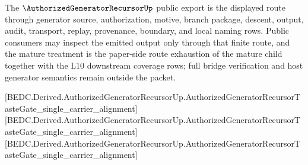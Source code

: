 The $\AuthorizedGeneratorRecursorUp$ public export is the displayed route through generator source, authorization, motive, branch package, descent, output, audit, transport, replay, provenance, boundary, and local naming rows. Public consumers may inspect the emitted output only through that finite route, and the mature treatment is the paper-side route exhaustion of the mature child together with the L10 downstream coverage rows; full bridge verification and host generator semantics remain outside the packet.

[BEDC.Derived.AuthorizedGeneratorRecursorUp.AuthorizedGeneratorRecursorTasteGate\_single\_carrier\_alignment]
[BEDC.Derived.AuthorizedGeneratorRecursorUp.AuthorizedGeneratorRecursorTasteGate\_single\_carrier\_alignment]
[BEDC.Derived.AuthorizedGeneratorRecursorUp.AuthorizedGeneratorRecursorTasteGate\_single\_carrier\_alignment]
